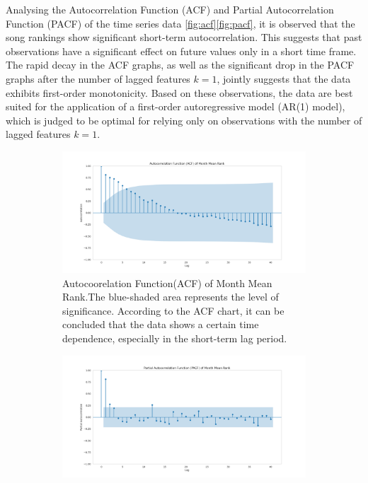 \documentclass{article}
\begin{document}
Analysing the Autocorrelation Function (ACF) and Partial Autocorrelation Function (PACF) of the time series data \autoref{fig:acf}\autoref{fig:pacf}, it is observed that the song rankings show significant short-term autocorrelation. This suggests that past observations have a significant effect on future values only in a short time frame. The rapid decay in the ACF graphs, as well as the significant drop in the PACF graphs after the number of lagged features $k=1$, jointly suggests that the data exhibits first-order monotonicity. Based on these observations, the data are best suited for the application of a first-order autoregressive model (AR(1) model), which is judged to be optimal for relying only on observations with the number of lagged features $k=1$.

\begin{figure}[ht]
  \centering
  \begin{subfigure}[t]{0.45\textwidth}
    \includegraphics[width=\textwidth]{acf.png}
    \captionsetup{labelformat=default}
    \caption{Autocoorelation Function(ACF) of Month Mean Rank.The blue-shaded area represents the level of significance. According to the ACF chart, it can be concluded that the data shows a certain time dependence, especially in the short-term lag period.}
    \label{fig:acf}
  \end{subfigure}
  \hfill
  \begin{subfigure}[t]{0.45\textwidth}
    \includegraphics[width=\textwidth]{pacf.png}

\end{subfigure}
\end{figure}
\end{document}

